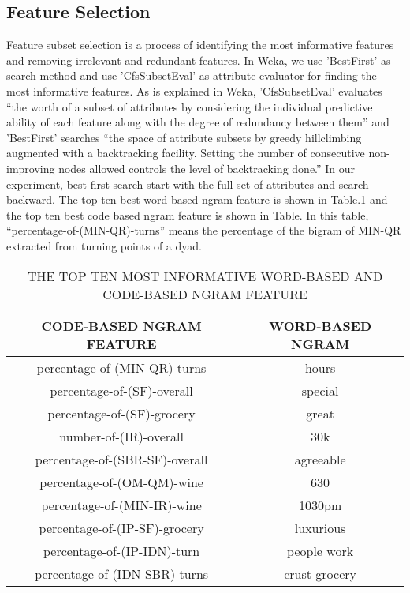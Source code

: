 \documentclass[11pt]{article} %
\begin{document}
\subsection{Feature Selection}
Feature subset selection is a process of identifying the most informative features and removing irrelevant and redundant features. In Weka, we use 'BestFirst' as search method and use 'CfsSubsetEval' as attribute evaluator for finding the most informative features. As is explained in Weka, 'CfsSubsetEval' evaluates ``the worth of a subset of attributes by considering the individual predictive ability of each feature along with the degree of redundancy between them'' and 'BestFirst' searches ``the space of attribute subsets by greedy hillclimbing augmented with a backtracking facility. Setting the number of consecutive non-improving nodes allowed controls the level of backtracking done.'' In our experiment, best first search start with the full set of attributes and search backward. The top ten best word based ngram feature is shown in Table.\ref{tab:selected_ngram} and the top ten best code based ngram feature is shown in Table. In this table, ``percentage-of-(MIN-QR)-turns'' means the percentage of the bigram of MIN-QR extracted from turning points of a dyad.
\begin{table}
  \centering
  \caption{THE TOP TEN MOST INFORMATIVE WORD-BASED AND CODE-BASED NGRAM FEATURE}
  \begin{tabular}{|c|c|}
     \hline
CODE-BASED NGRAM FEATURE & WORD-BASED NGRAM \\
  \hline
percentage-of-(MIN-QR)-turns & hours \\

percentage-of-(SF)-overall & special\\

percentage-of-(SF)-grocery & great\\

number-of-(IR)-overall & 30k\\

percentage-of-(SBR-SF)-overall & agreeable\\

percentage-of-(OM-QM)-wine & 630\\

percentage-of-(MIN-IR)-wine & 1030pm\\

percentage-of-(IP-SF)-grocery & luxurious\\

percentage-of-(IP-IDN)-turn & people work\\

percentage-of-(IDN-SBR)-turns & crust grocery\\
  \hline
  \end{tabular}\label{tab:selected_ngram}
\end{table}
\end{document}
